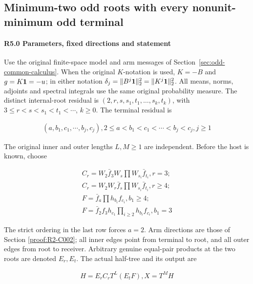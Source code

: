 \subsection{Minimum-two odd roots with every nonunit-minimum odd terminal}\label{proof:R2-C005}
\paragraph{R5.0 Parameters, fixed directions and statement}

Use the original finite-space model and arm messages of
Section~\ref{sec:odd-common-calculus}.
When the original \(K\)-notation is used, \(K=-B\) and
\(g=K\mathbf1=-u\); in either notation
\(\delta_j=\|B^j\mathbf1\|_2^2=\|K^j\mathbf1\|_2^2\).
All means, norms, adjoints and spectral integrals use the same
original probability measure.
The distinct internal-root residual is \((2,\allowbreak \allowbreak  r,\allowbreak \allowbreak  s,\allowbreak \allowbreak  s_1,\allowbreak \allowbreak  t_1,\allowbreak \allowbreak  \ldots,\allowbreak \allowbreak  s_k,\allowbreak \allowbreak  t_k)\), with \(3\le r<s<s_1<t_1<\cdots\), \(k\ge0\). The terminal residual is

\[
\begin{gathered}
(a,b_1,c_1,\cdots,b_j,c_j),2\le a<b_1<c_1<\cdots<b_j<c_j,j\ge 1
\end{gathered}
\]

The original inner and outer lengths \(L,\allowbreak \allowbreak  M\ge1\) are independent. Before the host is known, choose

\[
\begin{gathered}
C_r=W_2 \bar f_3 W_s \prod W_{s_i}\bar f_{t_i},r=3;\\
C_r=W_2 W_r \bar f_s \prod W_{s_i}\bar f_{t_i},r\ge 4;\\
F=\bar f_a \prod h_{b_i}f_{c_i},b_1\ge 4;\\
F=\bar f_2 f_3 h_{c_1} \prod_{i\ge 2} h_{b_i}f_{c_i},b_1=3
\end{gathered}
\]

The strict ordering in the last row forces \(a=2\). Arm directions are those of Section \ref{proof:R2-C002}; all inner edges point from terminal to root, and all outer edges from root to receiver. Arbitrary genuine equal-pair products at the two roots are denoted \(E_r,\allowbreak \allowbreak  E_t\). The actual half-tree and its output are

\[
\begin{gathered}
H=E_r C_r T^L(E_tF),X=T^M H
\end{gathered}
\]

